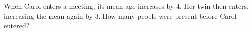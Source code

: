 When Carol enters a meeting, its mean age increases by $4$. Her twin then enters, increasing the mean again by $3$. How many people were present before Carol entered?
